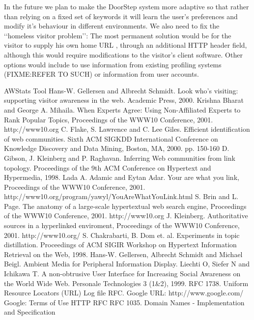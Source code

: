\documentclass[a4paper]{danarticle}
\theoremstyle{remark}
\begin{document}
    In the future we plan to make the DoorStep system more adaptive so that
    rather than relying on a fixed set of keywords it will learn the user's
    preferences and modify it's behaviour in different environments. We also need
    to fix the \lq\lq homeless visitor problem\rq\rq : The most permanent
    solution would be for the visitor to supply his own home URL \cite{webaware},
    through an additional HTTP header field, although this would require
    modifications to the visitor's client software. Other options would include
    to use information from existing profiling systems (FIXME:REFER TO SUCH) or
    information from user accounts.
  \begin{thebibliography}{99}
     AWStats Tool
     Hans-W. Gellersen and Albrecht Schmidt.
    Look who's visiting: supporting visitor awareness in the web.
    Academic Press, 2000.
     Krishna Bharat and George A. Mihaila.
     When Experts Agree: Using Non-Affiliated Experts to Rank Popular Topics,
     Proceedings of the WWW10 Conference, 2001.
     http://www10.org
     C. Flake, S. Lawrence and C. Lee Giles.
    Efficient identification of web communities.
    Sixth ACM SIGKDD International Conference on Knowledge Discovery and Data 
    Mining, Boston, MA, 2000. 
    pp. 150-160
     D. Gibson, J. Kleinberg and P. Raghavan.
    Inferring Web communities from link topology.
    Proceedings of the 9th ACM Conference on Hypertext and Hypermedia, 1998.
     Lada A. Adamic and Eytan Adar.
    Your are what you link, Proceedings of the WWW10 Conference, 2001.
    http://www10.org/program/yawyl/YouAreWhatYouLink.html
     S. Brin and L. Page.
    The anatomy of a large-scale hypertextual web search engine, 
    Proceedings of the WWW10 Conference, 2001.
    http://www10.org
     J. Kleinberg.
    Authoritative sources in a hyperlinked enviroment, Proceedings of the WWW10
    Conference, 2001.
    http://www10.org/
     S. Chakrabarti, B. Dom et. al.
    Experiments in topic distillation.
    Proceedings of ACM SIGIR Workshop on Hypertext Information Retrieval on
    the Web, 1998.
     Hans-W. Gellersen, Albrecht Schmidt and Michael Beigl.
    Ambient Media for Peripheral Information Display.
     Liechti O, Siefer N and Ichikawa T.
    A non-obtrusive User Interface for Increasing Social Awareness on the 
    World Wide Web. Personale Technologies 3 (1\&2), 1999.
     RFC 1738. Uniform Resource Locators (URL) 
     Log file RFC.
     Google URL: http://www.google.com/
     Google: Terms of Use
     HTTP RFC
     RFC 1035. Domain Names - Implementation and Specification
  \end{thebibliography}
\end{document}

